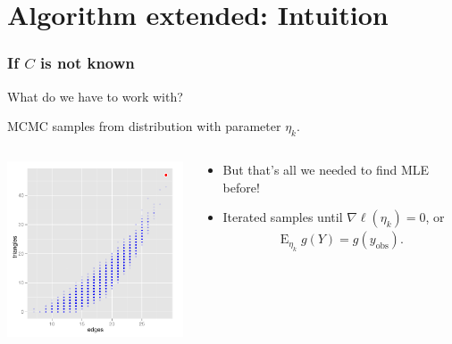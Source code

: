 \documentclass[ 10pt]{beamer}
\DeclareMathOperator{\E}{E}
\newcommand{\etaLCM}{\hat{\eta}_{\textrm{LCM}}}
\newcommand{\yobs}{y_{\text{obs}}}
\begin{document}
\section{Algorithm extended: Intuition}
\frame
{
\frametitle{If $C$ is not known}
What do we have to work with?
\vspace{4mm}

\pause
MCMC samples from distribution with parameter $\eta_k$.  

\vspace{1ex}

\begin{columns}[t]
\begin{column}[T]{0.39\textwidth}
\includegraphics[width=2.15in]{MCsample-bare}
\end{column}

\begin{column}[r]{0.61\textwidth}
\pause

\begin{itemize}
\item But that's all we needed to find MLE before! 
\vspace{1mm}


\item Iterated samples %
until $\nabla \ell(\eta_k) = 0$, or
\begin{align*}
	\E_{\eta_k} g(Y) = g(\yobs).
\end{align*}

\end{itemize}
\end{column}
\end{columns}
}
\end{document}
